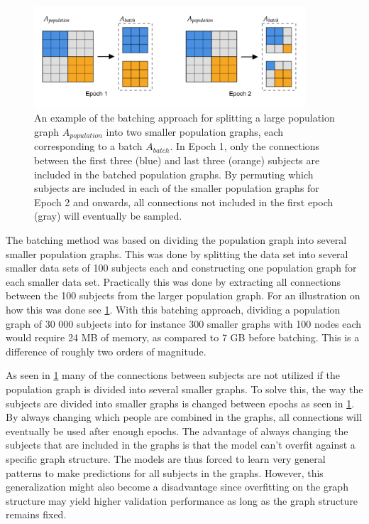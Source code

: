\begin{figure}[!htbp]
    \centering
    \includegraphics[width=0.9\textwidth]{chapters/images_methods/batching.png}
    \caption{An example of the batching approach for splitting a large population graph $A_{population}$ into two smaller population graphs, each corresponding to a batch $A_{batch}$. In Epoch 1, only the connections between the first three (blue) and last three (orange) subjects are included in the batched population graphs. By permuting which subjects are included in each of the smaller population graphs for Epoch 2 and onwards, all connections not included in the first epoch (gray) will eventually be sampled.}
    \label{fig:batches}
\end{figure}

The batching method was based on dividing the population graph into several smaller population graphs. This was done by splitting the data set into several smaller data sets of 100 subjects each and constructing one population graph for each smaller data set. Practically this was done by extracting all connections between the 100 subjects from the larger population graph. For an illustration on how this was done see \cref{fig:batches}. With this batching approach, dividing a population graph of 30 000 subjects into for instance 300 smaller graphs with 100 nodes each would require 24 MB of memory, as compared to 7 GB before batching. This is a difference of roughly two orders of magnitude.

As seen in \cref{fig:batches} many of the connections between subjects are not utilized if the population graph is divided into several smaller graphs. To solve this, the way the subjects are divided into smaller graphs is changed between epochs as seen in \cref{fig:batches}. By always changing which people are combined in the graphs, all connections will eventually be used after enough epochs. The advantage of always changing the subjects that are included in the graphs is that the model can't overfit against a specific graph structure. The models are thus forced to learn very general patterns to make predictions for all subjects in the graphs. However, this generalization might also become a disadvantage since overfitting on the graph structure may yield higher validation performance as long as the graph structure remains fixed. 


